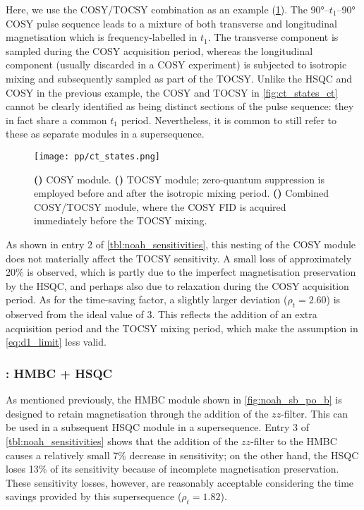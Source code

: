 Here, we use the COSY/TOCSY combination\autocite{Nolis2019MRC} as an example (\cref{fig:ct_states}).
The \ang{90}--$t_1$--\ang{90} COSY pulse sequence leads to a mixture of both transverse and longitudinal magnetisation which is frequency-labelled in $t_1$.
The transverse component is sampled during the COSY acquisition period, whereas the longitudinal component (usually discarded in a COSY experiment) is subjected to isotropic mixing and subsequently sampled as part of the TOCSY.
Unlike the HSQC and COSY in the previous example, the COSY and TOCSY in \cref{fig:ct_states_ct} cannot be clearly identified as being distinct sections of the pulse sequence: they in fact share a common $t_1$ period.
Nevertheless, it is common to still refer to these as separate modules in a supersequence.

\begin{figure}[!ht]
    \centering
    \texttt{[image: pp/ct\_states.png]}%
    {\label{fig:ct_states_c}}%
    {\label{fig:ct_states_t}}%
    {\label{fig:ct_states_ct}}%
    \caption[COSY/TOCSY NOAH module]{
        \textbf{()} COSY module.
        \textbf{()} TOCSY module; zero-quantum suppression is employed before and after the isotropic mixing period.
        \textbf{()} Combined COSY/TOCSY module, where the COSY FID is acquired immediately before the TOCSY mixing.
    }
    \label{fig:ct_states}
\end{figure}

As shown in entry 2 of \cref{tbl:noah_sensitivities}, this nesting of the COSY module does not materially affect the TOCSY sensitivity.
A small loss of approximately 20\% is observed, which is partly due to the imperfect magnetisation preservation by the HSQC, and perhaps also due to relaxation during the COSY acquisition period.
As for the time-saving factor, a slightly larger deviation ($\rho_t = 2.60$) is observed from the ideal value of $3$.
This reflects the addition of an extra acquisition period and the TOCSY mixing period, which make the assumption in \cref{eq:d1_limit} less valid.

\subsubsection{: HMBC + HSQC}

As mentioned previously, the HMBC module shown in \cref{fig:noah_sb_po_b} is designed to retain  magnetisation through the addition of the $zz$-filter.
This can be used in a subsequent HSQC module in a  supersequence.
Entry 3 of \cref{tbl:noah_sensitivities} shows that the addition of the $zz$-filter to the HMBC causes a relatively small 7\% decrease in sensitivity; on the other hand, the HSQC loses 13\% of its sensitivity because of incomplete magnetisation preservation.
These sensitivity losses, however, are reasonably acceptable considering the time savings provided by this supersequence ($\rho_t = 1.82$).

